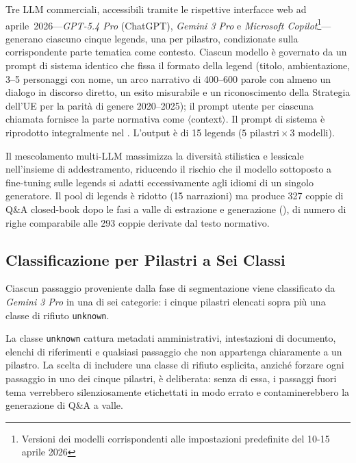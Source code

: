 \documentclass[pdflatex, sn-apa]{sn-jnl}%
\theoremstyle{thmstyleone}%
\theoremstyle{thmstyletwo}%
\theoremstyle{thmstylethree}%
\begin{document}
Tre LLM commerciali, accessibili tramite le rispettive interfacce web ad
aprile~2026---\textit{GPT-5.4 Pro} (ChatGPT), \textit{Gemini 3 Pro} e
\textit{Microsoft Copilot}\footnote{Versioni dei modelli corrispondenti alle
impostazioni predefinite del 10-15 aprile 2026}---generano ciascuno cinque
legends, una per pilastro, condizionate sulla corrispondente parte tematica come
contesto. Ciascun modello è governato da un prompt di sistema identico che fissa
il formato della legend (titolo, ambientazione, 3--5 personaggi con nome, un arco
narrativo di 400--600 parole con almeno un dialogo in discorso diretto, un esito
misurabile e un riconoscimento della Strategia dell'UE per la parità di genere
2020--2025); il prompt utente per ciascuna chiamata fornisce la parte normativa
come $\langle$context$\rangle$. Il prompt di sistema è riprodotto integralmente
nel . L'output è di 15 legends ($5 \text{ pilastri}
\times 3 \text{ modelli}$).

Il mescolamento multi-LLM massimizza la diversità stilistica e lessicale
nell'insieme di addestramento, riducendo il rischio che il modello sottoposto a
fine-tuning sulle legends si adatti eccessivamente agli idiomi di un singolo
generatore. Il pool di legends è ridotto (15 narrazioni) ma produce 327 coppie di
Q\&A closed-book dopo le fasi a valle di estrazione e generazione
(), di numero di righe comparabile alle 293 coppie derivate
dal testo normativo.

\subsection{Classificazione per Pilastri a Sei Classi}
\label{sec:method:pillar}

Ciascun passaggio proveniente dalla fase di segmentazione viene classificato da
\textit{Gemini 3 Pro} in una di sei categorie: i cinque pilastri elencati sopra
più una classe di rifiuto \texttt{unknown}.

La classe \texttt{unknown} cattura metadati amministrativi, intestazioni di
documento, elenchi di riferimenti e qualsiasi passaggio che non appartenga
chiaramente a un pilastro. La scelta di includere una classe di rifiuto
esplicita, anziché forzare ogni passaggio in uno dei cinque pilastri, è
deliberata: senza di essa, i passaggi fuori tema verrebbero silenziosamente
etichettati in modo errato e contaminerebbero la generazione di Q\&A a valle.
\end{document}
